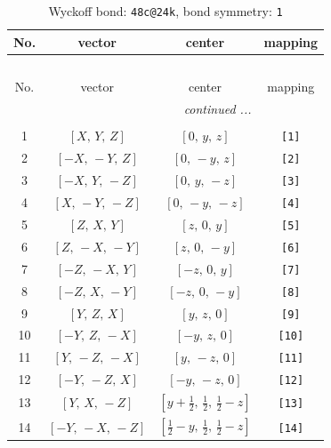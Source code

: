 \documentclass[fleqn,8pt]{jsarticle}
\begin{document}
\begin{longtable}{cccc}
\caption{Wyckoff bond: {\tt 48c@24k}, bond symmetry: {\tt 1}}
 \\
 \hline \hline
No. & vector & center & mapping \\ \hline \endfirsthead

\multicolumn{3}{l}{\tablename\ \thetable{}} \\
 \hline \hline
No. & vector & center & mapping \\ \hline \endhead

 \hline \hline
\multicolumn{3}{r}{\footnotesize\it continued ...} \\ \endfoot

 \hline \hline
\multicolumn{3}{r}{} \\ \endlastfoot

1 & $\left[ X,\, Y,\, Z \right]$ & $\left[ 0,\, y,\, z \right]$ & {\tt [1]} \\ \hline
2 & $\left[ - X,\, - Y,\, Z \right]$ & $\left[ 0,\, - y,\, z \right]$ & {\tt [2]} \\ \hline
3 & $\left[ - X,\, Y,\, - Z \right]$ & $\left[ 0,\, y,\, - z \right]$ & {\tt [3]} \\ \hline
4 & $\left[ X,\, - Y,\, - Z \right]$ & $\left[ 0,\, - y,\, - z \right]$ & {\tt [4]} \\ \hline
5 & $\left[ Z,\, X,\, Y \right]$ & $\left[ z,\, 0,\, y \right]$ & {\tt [5]} \\ \hline
6 & $\left[ Z,\, - X,\, - Y \right]$ & $\left[ z,\, 0,\, - y \right]$ & {\tt [6]} \\ \hline
7 & $\left[ - Z,\, - X,\, Y \right]$ & $\left[ - z,\, 0,\, y \right]$ & {\tt [7]} \\ \hline
8 & $\left[ - Z,\, X,\, - Y \right]$ & $\left[ - z,\, 0,\, - y \right]$ & {\tt [8]} \\ \hline
9 & $\left[ Y,\, Z,\, X \right]$ & $\left[ y,\, z,\, 0 \right]$ & {\tt [9]} \\ \hline
10 & $\left[ - Y,\, Z,\, - X \right]$ & $\left[ - y,\, z,\, 0 \right]$ & {\tt [10]} \\ \hline
11 & $\left[ Y,\, - Z,\, - X \right]$ & $\left[ y,\, - z,\, 0 \right]$ & {\tt [11]} \\ \hline
12 & $\left[ - Y,\, - Z,\, X \right]$ & $\left[ - y,\, - z,\, 0 \right]$ & {\tt [12]} \\ \hline
13 & $\left[ Y,\, X,\, - Z \right]$ & $\left[ y + \frac{1}{2},\, \frac{1}{2},\, \frac{1}{2} - z \right]$ & {\tt [13]} \\ \hline
14 & $\left[ - Y,\, - X,\, - Z \right]$ & $\left[ \frac{1}{2} - y,\, \frac{1}{2},\, \frac{1}{2} - z \right]$ & {\tt [14]} \\ \hline

\end{longtable}
\end{document}
